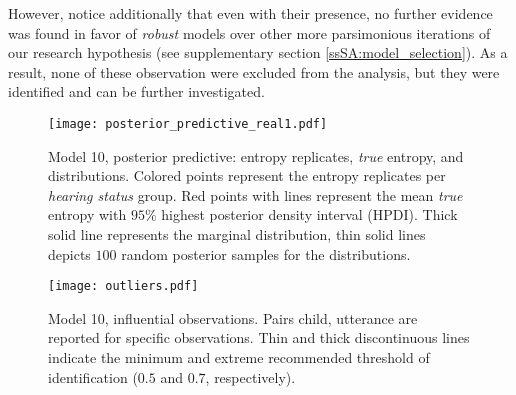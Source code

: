 However, notice additionally that even with their presence, no further evidence was found in favor of \textit{robust} models over other more parsimonious iterations of our research hypothesis (see supplementary section \ref{ssSA:model_selection}). As a result, none of these observation were excluded from the analysis, but they were identified and can be further investigated.
%
%
\begin{figure}[!h]
	\centering
	\texttt{[image: posterior\_predictive\_real1.pdf]}
	\caption[Model 10, posterior predictive: entropy replicates, \textit{true} entropy, and distributions]{Model 10, posterior predictive: entropy replicates, \textit{true} entropy, and distributions. Colored points represent the entropy replicates per \textit{hearing status} group. Red points with lines represent the mean \textit{true} entropy with $95\%$ highest posterior density interval (HPDI). Thick solid line represents the marginal distribution, thin solid lines depicts $100$ random posterior samples for the distributions.}
	\label{fig:predictive1}
\end{figure}
%
%
\begin{figure}[!h]
	\centering
	\texttt{[image: outliers.pdf]}
	\caption[Model 10, influential observations]{Model 10, influential observations. Pairs child, utterance are reported for specific observations. Thin and thick discontinuous lines indicate the minimum and extreme recommended threshold of identification ($0.5$ and $0.7$, respectively).}
	\label{fig:outliers}
\end{figure}
%
%